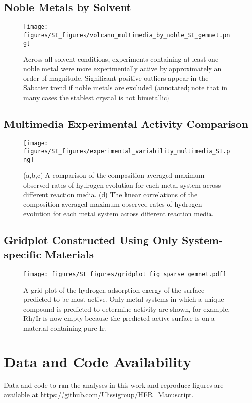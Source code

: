 \documentclass[journal=accacs,manuscript=suppinfo]{achemso}
\begin{document}
\subsection{Noble Metals by Solvent}
\begin{figure}[H]
\centering
    \texttt{[image: figures/SI\_figures/volcano\_multimedia\_by\_noble\_SI\_gemnet.png]}
\caption{Across all solvent conditions, experiments containing at least one noble metal were more experimentally active by approximately an order of magnitude. Significant positive outliers appear in the Sabatier trend if noble metals are excluded (annotated; note that in many cases the stablest crystal is not bimetallic)}
\label{fig:NobleSI}
\end{figure}
\subsection{Multimedia Experimental Activity Comparison}
\begin{figure}[H]
\centering
    \texttt{[image: figures/SI\_figures/experimental\_variability\_multimedia\_SI.png]}
\caption{(a,b,c) A comparison of the composition-averaged maximum observed rates of hydrogen evolution for each metal system across different reaction media. (d) The linear correlations of the composition-averaged maximum observed rates of hydrogen evolution for each metal system across different reaction media.}
\label{fig:ExperimentSI}
\end{figure}
\subsection{Gridplot Constructed Using Only System-specific Materials}
\begin{figure}[H]
\centering
    \texttt{[image: figures/SI\_figures/gridplot\_fig\_sparse\_gemnet.pdf]}
\caption{A grid plot of the hydrogen adsorption energy of the surface predicted to be most active. Only metal systems in which a unique compound is predicted to determine activity are shown, for example, Rh/Ir is now empty because the predicted active surface is on a material containing pure Ir.}
\label{fig:GridplotSI}
\end{figure}
\section{Data and Code Availability}
Data and code to run the analyses in this work and reproduce figures are available at https://github.com/Ulissigroup/HER\_Manuscript.
\end{document}
